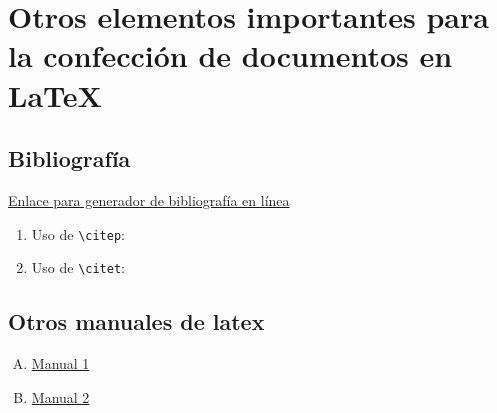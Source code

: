 \section{Otros elementos importantes para la confección de documentos en \LaTeX}


\subsection{Bibliografía}
\href{https://truben.no/latex/bibtex/#}{Enlace para generador de bibliografía en línea}

\begin{enumerate}
    \item Uso de \verb|\citep|: \citep{Rojas2022}
    \item Uso de \verb|\citet|: \citet*{Rojas2022}
\end{enumerate}



\subsection{Otros manuales de latex}
\begin{enumerate}[(A)]
    \item \href{https://www.overleaf.com/learn}{Manual 1}
    \item \href{https://manualdelatex.com/}{Manual 2}
\end{enumerate}

